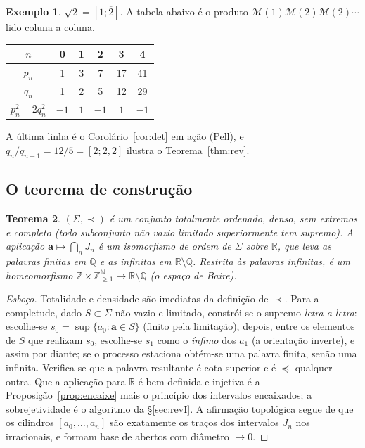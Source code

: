 \documentclass[11pt,a4paper]{article}
\theoremstyle{plain}
\newtheorem{teorema}{Teorema}[section]
\theoremstyle{definition}
\newtheorem{exemplo}[teorema]{Exemplo}
\theoremstyle{remark}
\newcommand{\R}{\mathbb{R}}
\newcommand{\Q}{\mathbb{Q}}
\newcommand{\Z}{\mathbb{Z}}
\newcommand{\N}{\mathbb{N}}
\newcommand{\Mat}[1]{\mathcal{M}(#1)}
\newcommand{\Sig}{\Sigma}
\newcommand{\cf}[2]{[#1;#2]}
\begin{document}
\begin{exemplo}
$\sqrt2 = \cf{1}{\overline{2}}$. A tabela abaixo é o produto $\Mat1\Mat2\Mat2\cdots$ lido coluna a coluna.
\begin{center}
\begin{tabular}{cccccc}
\toprule
$n$ & 0 & 1 & 2 & 3 & 4\\
\midrule
$p_n$ & 1 & 3 & 7 & 17 & 41\\
$q_n$ & 1 & 2 & 5 & 12 & 29\\
$p_n^2-2q_n^2$ & $-1$ & $1$ & $-1$ & $1$ & $-1$\\
\bottomrule
\end{tabular}
\end{center}
A última linha é o Corolário~\ref{cor:det} em ação (Pell), e $q_n/q_{n-1} = 12/5 = \cf{2}{2,2}$
ilustra o Teorema~\ref{thm:rev}.
\end{exemplo}

\subsection{O teorema de construção}

\begin{teorema}\label{thm:constr}
$(\Sig,\prec)$ é um conjunto totalmente ordenado, denso, sem extremos e \emph{completo}
(todo subconjunto não vazio limitado superiormente tem supremo). A aplicação
$\mathbf a \mapsto \bigcap_n J_n$ é um isomorfismo de ordem de $\Sig$ sobre $\R$, que leva as
palavras finitas em $\Q$ e as infinitas em $\R\setminus\Q$. Restrita às palavras infinitas, é
um homeomorfismo $\Z\times\Z_{\geq1}^{\N} \to \R\setminus\Q$ (o espaço de Baire).
\end{teorema}

\begin{proof}[Esboço]
Totalidade e densidade são imediatas da definição de $\prec$. Para a completude, dado
$S\subset\Sig$ não vazio e limitado, constrói-se o supremo \emph{letra a letra}: escolhe-se
$s_0 = \sup\{a_0 : \mathbf a \in S\}$ (finito pela limitação), depois, entre os elementos de $S$
que realizam $s_0$, escolhe-se $s_1$ como o \emph{ínfimo} dos $a_1$ (a orientação inverte),
e assim por diante; se o processo estaciona obtém-se uma palavra finita, senão uma infinita.
Verifica-se que a palavra resultante é cota superior e é $\preceq$ qualquer outra.
Que a aplicação para $\R$ é bem definida e injetiva é a Proposição~\ref{prop:encaixe} mais o
princípio dos intervalos encaixados; a sobrejetividade é o algoritmo da \S\ref{sec:revI}.
A afirmação topológica segue de que os cilindros $[a_0,\dots,a_n]$ são exatamente os traços dos
intervalos $J_n$ nos irracionais, e formam base de abertos com diâmetro $\to 0$.
\end{proof}
\end{document}
